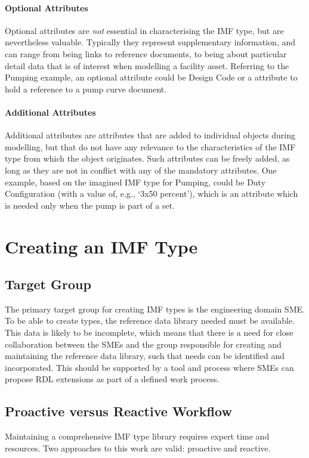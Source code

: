 \documentclass[../main.tex]{subfiles}
\begin{document}
\paragraph{Optional Attributes} Optional attributes are \textit{not} essential in characterising the IMF type, but are nevertheless valuable. Typically they represent supplementary information, and can range from being links to reference documents, to being about particular detail data that is of interest when modelling a facility asset. Referring to the Pumping example, an optional attribute could be Design Code or a attribute to hold a reference to a pump curve document.

\paragraph{Additional Attributes} Additional attributes are attributes that are added to individual objects during modelling, but that do not have any relevance to the characteristics of the IMF type from which the object originates. Such attributes can be freely added, as long as they are not in conflict with any of the mandatory attributes. One example, based on the imagined IMF type for Pumping, could be Duty Configuration (with a value of, e.g., `3x50 percent'), which is an attribute which is needed only when the pump is part of a set.

\section{Creating an IMF Type}
\subsection{Target Group}
The primary target group for creating IMF types is the engineering domain SME. To be able to create types, the reference data library needed must be available. This data is likely to be incomplete, which means that
there is a need for close collaboration between the SMEs and the group responsible for creating and maintaining the reference data library, such that needs can be identified and incorporated. This should be supported by a tool and process where SMEs can propose RDL extensions as part of a defined work process.

\subsection{Proactive versus Reactive Workflow}
Maintaining a comprehensive IMF type library requires expert time and resources. Two approaches to this work are valid: proactive and reactive.
\end{document}

